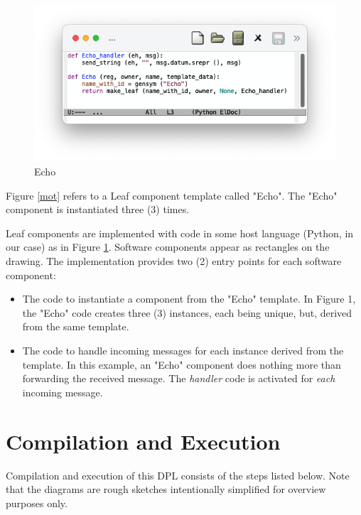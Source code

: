 \documentclass[10pt,anonymous,review]{acmart}
\begin{document}
\vspace{1\baselineskip}

\begin{figure}
    \centering
    \includegraphics[trim=1cm 1.9cm 1cm 1cm, clip, scale=0.4]{./media/echo.png}
    \caption{Echo}
    \label{fig:echo}
\end{figure}
Figure \ref{mot} refers to a Leaf component template called "Echo". The "Echo"
component is instantiated three (3) times. 

\vspace{5\baselineskip}

Leaf components are
implemented with code in some host language (Python, in our case) as in Figure \ref{fig:echo}. Software components
appear as rectangles on the drawing. The implementation provides two (2)
entry points for each software component:
\begin{itemize}
\item The code to instantiate a component from the "Echo" template. In Figure
1, the "Echo" code creates three (3) instances, each being unique, but,
derived from the same template.

\item The code to handle incoming messages for each instance derived from the
template. In this example, an "Echo" component does nothing more than
forwarding the received message. The \emph{handler} code is activated for
\emph{each} incoming message.
\end{itemize}

\section{Compilation and Execution}
Compilation and execution of this DPL consists of the steps listed below. Note that the diagrams are rough sketches intentionally simplified
for overview purposes only.
\end{document}

